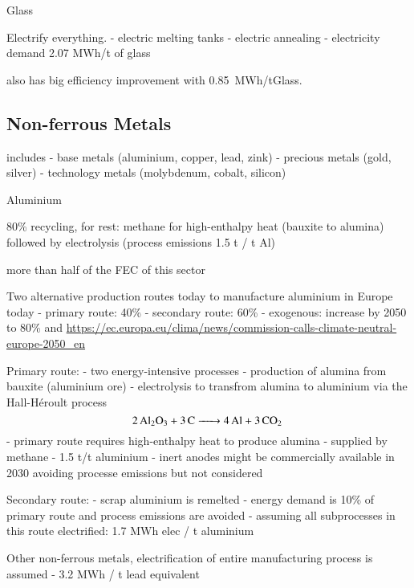 
Glass

Electrify everything.
- electric melting tanks
- electric annealing
- electricity demand 2.07 MWh/t of glass 



 also has big efficiency improvement with 0.85~MWh\el/tGlass.

\subsection{Non-ferrous Metals}
\label{sec:si:industry:nfm}

includes
- base metals (aluminium, copper, lead, zink)
- precious metals (gold, silver)
- technology metals (molybdenum, cobalt, silicon)

Aluminium

80\% recycling, for rest: methane for high-enthalpy heat (bauxite to alumina) followed by electrolysis (process emissions 1.5 t \co / t Al)

more than half of the FEC of this sector

Two alternative production routes today to manufacture aluminium in Europe today
- primary route: 40\%
- secondary route: 60\%
- exogenous: increase by 2050 to 80\%  and \url{https://ec.europa.eu/clima/news/commission-calls-climate-neutral-europe-2050_en}

Primary route:
- two energy-intensive processes
- production of alumina from bauxite (aluminium ore)
- electrolysis to transfrom alumina to aluminium via the Hall-H\'{e}roult process
\begin{equation}
    \ce{2Al2O3 + 3C -> 4Al + 3\co}
\end{equation}
- primary route requires high-enthalpy heat to produce alumina - supplied by methane
- 1.5 t\co/t aluminium
- inert anodes might be commercially available in 2030 avoiding processe emissions  but not considered

Secondary route:
- scrap aluminium is remelted
- energy demand is 10\% of primary route and process emissions are avoided
- assuming all subprocesses in this route electrified: 1.7 MWh elec / t aluminium

Other non-ferrous metals, electrification of entire manufacturing process is assumed
- 3.2 MWh / t lead equivalent

